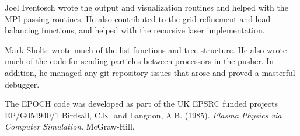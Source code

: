 \documentclass[]{article}
\begin{document}
Joel Iventosch wrote the output and visualization routines and helped with the MPI passing routines.  He also contributed to the grid refinement and load balancing functions, and helped with the recursive laser implementation.

Mark Sholte wrote much of the list functions and tree structure.  He also wrote much of the code for sending particles between processors in the pusher. In addition, he managed any git repository issues that arose and proved a masterful debugger.



{\def\section*#1{}
\begin{thebibliography}{1}
\setlength{\itemsep}{0pt}
The EPOCH code was developed as part of the UK EPSRC funded projects EP/G054940/1
Birdsall, C.K. and Langdon, A.B.  (1985). \textit{Plasma Physics via Computer Simulation}. McGraw-Hill.

\end{thebibliography}
}
\end{document}
